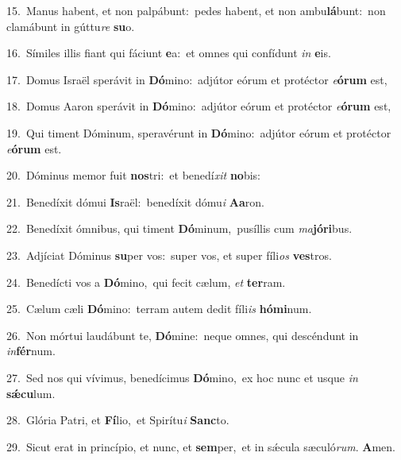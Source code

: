 {\numbfont\textcolor{\numbcolor}{15.}}~Manus habent, et non palpábunt:~\dagger pedes habent, et non ambu\-\textbf{lá}\-bunt:~\star non clamábunt in gúttu\textit{re} \textbf{su}\-o.\par
{\numbfont\textcolor{\numbcolor}{16.}}~Símiles illis fiant qui fáciunt \textbf{e}\-a:~\star et omnes qui confídunt \textit{in} \textbf{e}\-is.\par
{\numbfont\textcolor{\numbcolor}{17.}}~Domus Israël sperávit in \textbf{Dó}\-mino:~\star adjútor eórum et protéctor \textit{e}\-\textbf{ó}\textbf{rum} est,\par
{\numbfont\textcolor{\numbcolor}{18.}}~Domus Aaron sperávit in \textbf{Dó}\-mino:~\star adjútor eórum et protéctor \textit{e}\-\textbf{ó}\textbf{rum} est,\par
{\numbfont\textcolor{\numbcolor}{19.}}~Qui timent Dóminum, speravérunt in \textbf{Dó}\-mino:~\star adjútor eórum et protéctor \textit{e}\-\textbf{ó}\textbf{rum} est.\par
{\numbfont\textcolor{\numbcolor}{20.}}~Dóminus memor fuit \textbf{nos}\-tri:~\star et benedí\textit{xit} \textbf{no}\-bis:\par
{\numbfont\textcolor{\numbcolor}{21.}}~Benedíxit dómui \textbf{Is}\-raël:~\star benedíxit dómu\textit{i} \textbf{A}\-\textbf{a}ron.\par
{\numbfont\textcolor{\numbcolor}{22.}}~Benedíxit ómnibus, qui timent \textbf{Dó}\-minum,~\star pusíllis cum \textit{ma}\-\textbf{jó}\textbf{ri}bus.\par
{\numbfont\textcolor{\numbcolor}{23.}}~Adjíciat Dóminus \textbf{su}\-per vos:~\star super vos, et super fíli\textit{os} \textbf{ves}\-tros.\par
{\numbfont\textcolor{\numbcolor}{24.}}~Benedícti vos a \textbf{Dó}\-mino,~\star qui fecit cælum, \textit{et} \textbf{ter}\-ram.\par
{\numbfont\textcolor{\numbcolor}{25.}}~Cælum cæli \textbf{Dó}\-mino:~\star terram autem dedit fíli\textit{is} \textbf{hó}\-\textbf{mi}num.\par
{\numbfont\textcolor{\numbcolor}{26.}}~Non mórtui laudábunt te, \textbf{Dó}\-mine:~\star neque omnes, qui descéndunt in \textit{in}\-\textbf{fér}num.\par
{\numbfont\textcolor{\numbcolor}{27.}}~Sed nos qui vívimus, benedícimus \textbf{Dó}\-mino,~\star ex hoc nunc et usque \textit{in} \textbf{sǽ}\-\textbf{cu}lum.\par
{\numbfont\textcolor{\numbcolor}{28.}}~Glória Patri, et \textbf{Fí}\-lio,~\star et Spirítu\textit{i} \textbf{Sanc}\-to.\par
{\numbfont\textcolor{\numbcolor}{29.}}~Sicut erat in princípio, et nunc, et \textbf{sem}\-per,~\star et in sǽcula sæculó\-\textit{rum}\-. \textbf{A}\-men.\par
